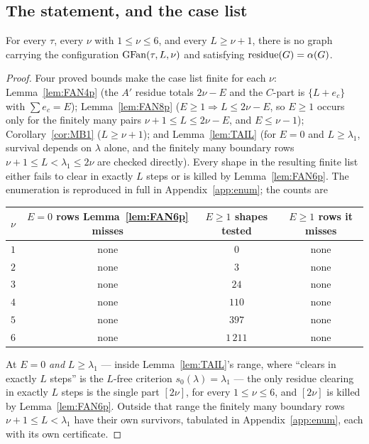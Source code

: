 \subsection{The statement, and the case list}

\begin{theorem}\label{thm:GFANnu}
For every $\tau$, every $\nu$ with $1 \le \nu \le 6$, and every $L \ge \nu+1$, there is no
graph carrying the configuration $\mathrm{GFan}(\tau,L,\nu)$ and satisfying $\operatorname{residue}(G) = \alpha(G)$.
\end{theorem}

\begin{proof}
Four proved bounds make the case list finite for each $\nu$: Lemma~\ref{lem:FAN4p} (the
$A'$ residue totals $2\nu-E$ and the $C$-part is $\{L+e_c\}$ with $\sum e_c = E$);
Lemma~\ref{lem:FAN8p} ($E \ge 1 \Rightarrow L \le 2\nu-E$, so $E \ge 1$ occurs only for the
finitely many pairs $\nu+1 \le L \le 2\nu-E$, and $E \le \nu-1$); Corollary~\ref{cor:MB1}
($L \ge \nu+1$); and Lemma~\ref{lem:TAIL} (for $E = 0$ and $L \ge \lambda_1$, survival
depends on $\lambda$ alone, and the finitely many boundary rows
$\nu+1 \le L < \lambda_1 \le 2\nu$ are checked directly). Every shape in the resulting
finite list either fails to clear in exactly $L$ steps or is killed by
Lemma~\ref{lem:FAN6p}. The enumeration is reproduced in full in
Appendix~\ref{app:enum}; the counts are
\begin{center}
\begin{tabular}{@{}cccc@{}}
\toprule
$\nu$ & $E = 0$ rows Lemma~\ref{lem:FAN6p} misses & $E \ge 1$ shapes tested &
$E \ge 1$ rows it misses \\
\midrule
$1$ & none & $0$ & none \\
$2$ & none & $3$ & none \\
$3$ & none & $24$ & none \\
$4$ & none & $110$ & none \\
$5$ & none & $397$ & none \\
$6$ & none & $1\,211$ & none \\
\bottomrule
\end{tabular}
\end{center}
At $E = 0$ \emph{and} $L \ge \lambda_1$ --- inside Lemma~\ref{lem:TAIL}'s range, where
``clears in exactly $L$ steps'' is the $L$-free criterion $s_0(\lambda) = \lambda_1$ --- the
only residue clearing in exactly $L$ steps is the single part $[2\nu]$, for every
$1 \le \nu \le 6$, and $[2\nu]$ is killed by Lemma~\ref{lem:FAN6p}. Outside that range the
finitely many boundary rows $\nu+1 \le L < \lambda_1$ have their own survivors, tabulated in
Appendix~\ref{app:enum}, each with its own certificate.
\end{proof}

